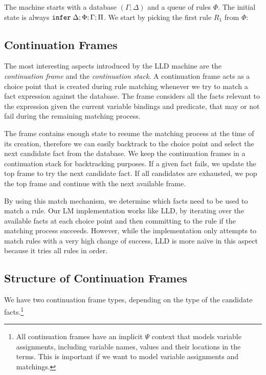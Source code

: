 The machine starts with a database $(\Gamma; \Delta)$ and a queue of rules
$\Phi$. The initial state is always $\mathtt{infer} \; \Delta; \Phi; \Gamma; \Pi$.
We start by picking the first rule $R_1$ from $\Phi$:



\subsection{Continuation Frames}

The most interesting aspects introduced by the LLD machine are the
\emph{continuation frame} and the \emph{continuation stack}. A continuation
frame acts as a choice point that is created during rule matching whenever we
try to match a fact expression against the database.  The frame considers all
the facts relevant to the expression given the current variable bindings and
predicate, that may or not fail during the remaining matching process.

The frame contains enough state to resume the matching process at the time of
its creation, therefore we can easily backtrack to the choice point and select
the next candidate fact from the database.  We keep the continuation frames in a
continuation stack for backtracking purposes. If a given fact fails, we update
the top frame to try the next candidate fact. If all candidates are exhausted,
we pop the top frame and continue with the next available frame.

By using this match mechanism, we determine which facts need to be used to match
a rule.  Our LM implementation works like LLD, by iterating over the available
facts at each choice point and then committing to the rule if the matching
process succeeds. However, while the implementation only attempts to match rules
with a very high change of success, LLD is more na\"{i}ve in this aspect because
it tries all rules in order.


\subsection{Structure of Continuation Frames}

We have two continuation frame types, depending on the type of the candidate
facts.\footnote{All continuation frames have an implicit $\Psi$ context that
models variable assignments, including variable names, values and their
locations in the terms. This is important if we want to model variable
assignments and matchings.}

